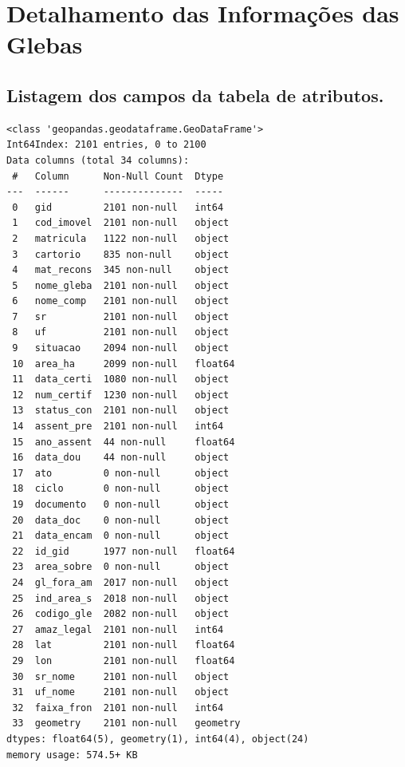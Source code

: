 \documentclass[
  letterpaper,
]{report}
\begin{document}

\hypertarget{detalhamento-das-informauxe7uxf5es-das-glebas}{%
\chapter{Detalhamento das Informações das
Glebas}\label{detalhamento-das-informauxe7uxf5es-das-glebas}}

\hypertarget{listagem-dos-campos-da-tabela-de-atributos.}{%
\section{Listagem dos campos da tabela de
atributos.}\label{listagem-dos-campos-da-tabela-de-atributos.}}

\begin{verbatim}
<class 'geopandas.geodataframe.GeoDataFrame'>
Int64Index: 2101 entries, 0 to 2100
Data columns (total 34 columns):
 #   Column      Non-Null Count  Dtype   
---  ------      --------------  -----   
 0   gid         2101 non-null   int64   
 1   cod_imovel  2101 non-null   object  
 2   matricula   1122 non-null   object  
 3   cartorio    835 non-null    object  
 4   mat_recons  345 non-null    object  
 5   nome_gleba  2101 non-null   object  
 6   nome_comp   2101 non-null   object  
 7   sr          2101 non-null   object  
 8   uf          2101 non-null   object  
 9   situacao    2094 non-null   object  
 10  area_ha     2099 non-null   float64 
 11  data_certi  1080 non-null   object  
 12  num_certif  1230 non-null   object  
 13  status_con  2101 non-null   object  
 14  assent_pre  2101 non-null   int64   
 15  ano_assent  44 non-null     float64 
 16  data_dou    44 non-null     object  
 17  ato         0 non-null      object  
 18  ciclo       0 non-null      object  
 19  documento   0 non-null      object  
 20  data_doc    0 non-null      object  
 21  data_encam  0 non-null      object  
 22  id_gid      1977 non-null   float64 
 23  area_sobre  0 non-null      object  
 24  gl_fora_am  2017 non-null   object  
 25  ind_area_s  2018 non-null   object  
 26  codigo_gle  2082 non-null   object  
 27  amaz_legal  2101 non-null   int64   
 28  lat         2101 non-null   float64 
 29  lon         2101 non-null   float64 
 30  sr_nome     2101 non-null   object  
 31  uf_nome     2101 non-null   object  
 32  faixa_fron  2101 non-null   int64   
 33  geometry    2101 non-null   geometry
dtypes: float64(5), geometry(1), int64(4), object(24)
memory usage: 574.5+ KB
\end{verbatim}
\end{document}

